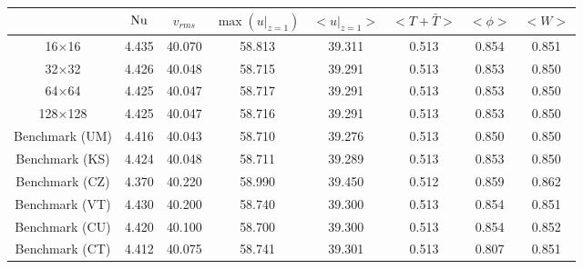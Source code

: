 \begin{tabular}{c|ccccccc}
    & $\mathrm{Nu}$ & $v_{rms}$ & $\max(u|_{z=1})$ & $<u|_{z=1}>$ & $<T + \bar{T}>$ & $<\phi>$ & $<W>$ \\
\hline
16$\times$16 & 4.435 & 40.070 & 58.813 & 39.311 & 0.513 & 0.854 & 0.851 \\
32$\times$32 & 4.426 & 40.048 & 58.715 & 39.291 & 0.513 & 0.853 & 0.850 \\
64$\times$64 & 4.425 & 40.047 & 58.717 & 39.291 & 0.513 & 0.853 & 0.850 \\
128$\times$128 & 4.425 & 40.047 & 58.716 & 39.291 & 0.513 & 0.853 & 0.850 \\
\hline
Benchmark (UM) & 4.416 & 40.043 & 58.710 & 39.276 & 0.513 & 0.850 & 0.850 \\
Benchmark (KS) & 4.424 & 40.048 & 58.711 & 39.289 & 0.513 & 0.853 & 0.850 \\
Benchmark (CZ) & 4.370 & 40.220 & 58.990 & 39.450 & 0.512 & 0.859 & 0.862 \\
Benchmark (VT) & 4.430 & 40.200 & 58.740 & 39.300 & 0.513 & 0.854 & 0.851 \\
Benchmark (CU) & 4.420 & 40.100 & 58.700 & 39.300 & 0.513 & 0.854 & 0.852 \\
Benchmark (CT) & 4.412 & 40.075 & 58.741 & 39.301 & 0.513 & 0.807 & 0.851 \\
\end{tabular}
